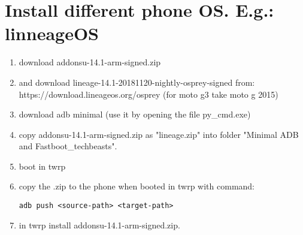 \section{Install different phone OS. E.g.: linneageOS}\label{sec:ch4}
\begin{enumerate}
    \item download addonsu-14.1-arm-signed.zip
    \item and download lineage-14.1-20181120-nightly-osprey-signed from: https://download.lineageos.org/osprey (for moto g3 take moto g 2015)
    \item download adb minimal (use it by opening the file py\_cmd.exe)
    \item copy addonsu-14.1-arm-signed.zip as "lineage.zip" into folder "Minimal ADB and Fastboot\_techbeasts".
    \item boot in twrp
    \item copy the .zip to the phone when booted in twrp with command:
\begin{verbatim}
adb push <source-path> <target-path>    
\end{verbatim}

    \item in twrp install addonsu-14.1-arm-signed.zip.
\end{enumerate}
